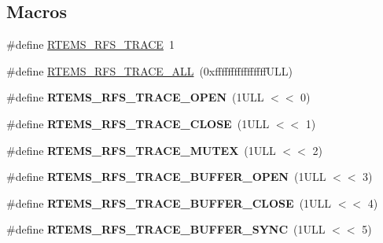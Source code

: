\subsection*{Macros}
\begin{DoxyCompactItemize}
\item 
\#define \mbox{\hyperlink{rtems-rfs-trace_8h_ad7b887d246c5da3cb12c3399356e553b}{R\+T\+E\+M\+S\+\_\+\+R\+F\+S\+\_\+\+T\+R\+A\+CE}}~1
\item 
\#define \mbox{\hyperlink{rtems-rfs-trace_8h_a0c61259c6cb7fdcc8d47066b78969fa1}{R\+T\+E\+M\+S\+\_\+\+R\+F\+S\+\_\+\+T\+R\+A\+C\+E\+\_\+\+A\+LL}}~(0xffffffffffffffff\+U\+L\+L)
\item 
\mbox{\label{rtems-rfs-trace_8h_a2e11f254c436b3f54ca1df4c123ebcad}} 
\#define {\bfseries R\+T\+E\+M\+S\+\_\+\+R\+F\+S\+\_\+\+T\+R\+A\+C\+E\+\_\+\+O\+P\+EN}~(1\+U\+L\+L $<$$<$ 0)
\item 
\mbox{\label{rtems-rfs-trace_8h_a8df2bd858dc50ba1ecb7e944ff7b5d3a}} 
\#define {\bfseries R\+T\+E\+M\+S\+\_\+\+R\+F\+S\+\_\+\+T\+R\+A\+C\+E\+\_\+\+C\+L\+O\+SE}~(1\+U\+L\+L $<$$<$ 1)
\item 
\mbox{\label{rtems-rfs-trace_8h_ad5e40c254ee985dce0f159cfd13cf873}} 
\#define {\bfseries R\+T\+E\+M\+S\+\_\+\+R\+F\+S\+\_\+\+T\+R\+A\+C\+E\+\_\+\+M\+U\+T\+EX}~(1\+U\+L\+L $<$$<$ 2)
\item 
\mbox{\label{rtems-rfs-trace_8h_a25a898cfee84bd6938f5f198867b4362}} 
\#define {\bfseries R\+T\+E\+M\+S\+\_\+\+R\+F\+S\+\_\+\+T\+R\+A\+C\+E\+\_\+\+B\+U\+F\+F\+E\+R\+\_\+\+O\+P\+EN}~(1\+U\+L\+L $<$$<$ 3)
\item 
\mbox{\label{rtems-rfs-trace_8h_a4b64373f70169873fbc7fb24ea40628f}} 
\#define {\bfseries R\+T\+E\+M\+S\+\_\+\+R\+F\+S\+\_\+\+T\+R\+A\+C\+E\+\_\+\+B\+U\+F\+F\+E\+R\+\_\+\+C\+L\+O\+SE}~(1\+U\+L\+L $<$$<$ 4)
\item 
\mbox{\label{rtems-rfs-trace_8h_a3e31ea089a152a7a658f90c17251adbf}} 
\#define {\bfseries R\+T\+E\+M\+S\+\_\+\+R\+F\+S\+\_\+\+T\+R\+A\+C\+E\+\_\+\+B\+U\+F\+F\+E\+R\+\_\+\+S\+Y\+NC}~(1\+U\+L\+L $<$$<$ 5)
\item 
\mbox{\label{rtems-rfs-trace_8h_a4a2582bcce39eff393f23443c9c8d2c7}} 

\end{DoxyCompactItemize}
